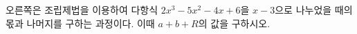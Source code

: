 \noindent\begin{minipage}[t]{0.6\linewidth}\vspace{0pt}\raggedright 오른쪽은 조립제법을 이용하여 다항식 $2x^3-5x^2-4x+6$을 $x-3$으로 나누었을 때의 몫과 나머지를 구하는 과정이다. 이때 $a+b+R$의 값을 구하시오.\end{minipage}\hfill\begin{minipage}[t]{0.37\linewidth}\vspace{0pt}\end{minipage}
